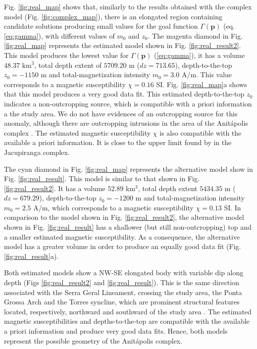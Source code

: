 Fig. \ref{fig:real_map} shows that, similarly to the results obtained with the 
complex model (Fig. \ref{fig:complex_map}), there is an elongated region containing 
candidate solutions producing small values for the goal function 
$\Gamma(\mathbf{p})$ (eq. \ref{eq:gamma}), with different values of $m_0$ and $z_0$.
The magenta diamond in Fig. \ref{fig:real_map} represents the estimated model 
shown in Fig. \ref{fig:real_result2}. 
This model produces the lowest value for $ \Gamma(\mathbf{p}) $ (\ref{eq:gamma}),
it has a volume $ 48.37 $ km$ ^3 $, total depth extent of $ 5709.20 $ m 
($ dz = 713.65 $), depth-to-the-top $z_0 = -1150$ m and total-magnetization intensity 
$m_0 = 3.0$ A/m. This value corresponds to a magnetic susceptibility 
$\chi = 0.16$ SI.
Fig. \ref{fig:real_map}a shows that this model produces a very good data fit.
This estimated depth-to-the-top $z_0$ indicates a non-outcropping source, 
which is compatible with a priori information a the study area. 
We do not have evidences of an outcropping source for this anomaly, 
although there are outcropping intrusions in the area of the Anit{\'a}polis 
complex \cite[]{gibson-1999}.
The estimated magnetic susceptibility $ \chi $ is also compatible with the 
available a priori information. It is close to the upper limit found by 
\citet{valdivia-2009} in the Jacupiranga complex.

The cyan diamond in Fig. \ref{fig:real_map} represents the alternative model 
show in Fig. \ref{fig:real_result}. This model is similar to that shown in 
Fig. \ref{fig:real_result2}. It has a volume $ 52.89 $ km$ ^3 $, total depth extent 
$ 5434.35 $ m ($ dz = 679.29 $), depth-to-the-top $z_0 = -1200$ m and 
total-magnetization intensity $m_0 = 2.5$ A/m, which corresponds to a magnetic 
susceptibility $\chi = 0.13$ SI. 
In comparison to the model shown in Fig. \ref{fig:real_result2}, the alternative model 
shown in Fig. \ref{fig:real_result} has a shallower (but still non-outcropping) top
and a smaller estimated magnetic susceptibility. As a consequence, the alternative 
model has a greater volume in order to produce an equally good data fit 
(Fig. \ref{fig:real_result}a).

Both estimated models show a NW-SE elongated body with variable dip along depth 
(Figs \ref{fig:real_result2} and \ref{fig:real_result}).
This is the same direction associated with the Serra Geral Lineament, 
crossing the study area, the Ponta Grossa Arch and the Torres syncline,
which are prominent structural features located, respectively, 
northward and southward of the study area \citep[e.g., ][ p. 535]{scheibe-etal2005}.
The estimated magnetic susceptibilities and depths-to-the-top are compatible with 
the available a priori information and produce very good data fits.
Hence, both models represent the possible geometry of the Anit{\'a}polis complex. 